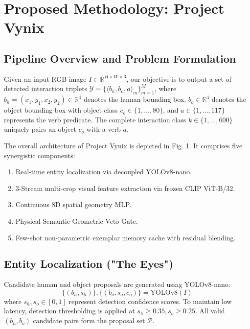 \documentclass[conference]{IEEEtran}
\begin{document}
\section{Proposed Methodology: Project Vynix}

\subsection{Pipeline Overview and Problem Formulation}
Given an input RGB image $I \in \mathbb{R}^{H \times W \times 3}$, our objective is to output a set of detected interaction triplets $\mathcal{Y} = \{ \langle b_h, b_o, a \rangle_m \}_{m=1}^M$, where $b_h = (x_1, y_1, x_2, y_2) \in \mathbb{R}^4$ denotes the human bounding box, $b_o \in \mathbb{R}^4$ denotes the object bounding box with object class $c_o \in \{1, \dots, 80\}$, and $a \in \{1, \dots, 117\}$ represents the verb predicate. The complete interaction class $k \in \{1, \dots, 600\}$ uniquely pairs an object $c_o$ with a verb $a$.

The overall architecture of Project Vynix is depicted in Fig. 1. It comprises five synergistic components:
\begin{enumerate}
    \item Real-time entity localization via decoupled YOLOv8-nano.
    \item 3-Stream multi-crop visual feature extraction via frozen CLIP ViT-B/32.
    \item Continuous 8D spatial geometry MLP.
    \item Physical-Semantic Geometric Veto Gate.
    \item Few-shot non-parametric exemplar memory cache with residual blending.
\end{enumerate}

\subsection{Entity Localization ("The Eyes")}
Candidate human and object proposals are generated using YOLOv8-nano:
\begin{equation}
    \{(b_h, s_h)\}, \{(b_o, s_o, c_o)\} = \text{YOLOv8}(I)
\end{equation}
where $s_h, s_o \in [0, 1]$ represent detection confidence scores. To maintain low latency, detection thresholding is applied at $s_h \ge 0.35, s_o \ge 0.25$. All valid $(b_h, b_o)$ candidate pairs form the proposal set $\mathcal{P}$.
\end{document}
